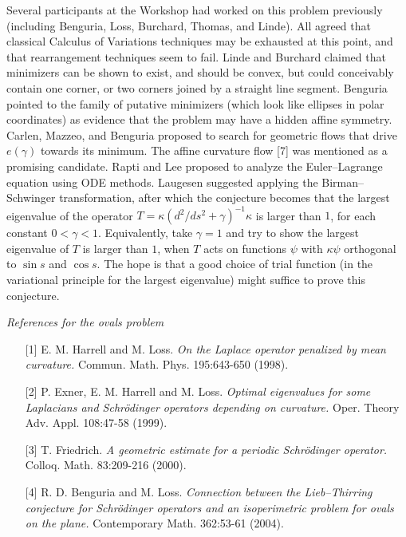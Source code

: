 \documentclass[12pt,letterpaper, reqno]{amsart}
\begin{document}
\begin{problemblock}
\begin{remark}
Several participants at the Workshop had worked on this problem
previously (including Benguria, Loss, Burchard, Thomas, and Linde).
All agreed that classical Calculus of Variations techniques may be
exhausted at this point, and that rearrangement techniques seem to
fail. Linde and Burchard claimed that minimizers can be shown to
exist, and should be convex, but could conceivably contain one
corner, or two corners joined by a straight line segment.  Benguria
pointed to the family of putative minimizers (which look like
ellipses in polar coordinates) as evidence that the problem may have
a hidden affine symmetry. Carlen, Mazzeo, and Benguria proposed to
search for geometric flows that drive $e(\gamma)$ towards its
minimum. The affine curvature flow [7] was mentioned as a promising
candidate. Rapti and Lee proposed to analyze the Euler--Lagrange
equation using ODE methods. Laugesen suggested applying the
Birman--Schwinger transformation, after which the conjecture becomes
that the largest eigenvalue of the operator $T = \kappa (d^2/ds^2 +
\gamma)^{-1} \kappa$ is larger than $1$, for each constant
$0<\gamma<1$. Equivalently, take $\gamma=1$ and try to show the
largest eigenvalue of $T$ is larger than $1$, when $T$ acts on
functions $\psi$ with $\kappa \psi$ orthogonal to $\sin s$ and $\cos
s$. The hope is that a good choice of trial function (in the
variational principle for the largest eigenvalue) might suffice to
prove this conjecture.
\end{remark}

\vspace{6pt} \noindent \emph{References for the ovals problem}

\begin{itemize}

\item[{[1]}] E. M. Harrell and M. Loss. \emph{On the Laplace operator
penalized by mean curvature.} Commun. Math. Phys. 195:643-650
(1998).

\item[{[2]}] P. Exner, E. M. Harrell and M. Loss. \emph{Optimal
eigenvalues  for some Laplacians and Schr\"odinger operators
depending on curvature.} Oper. Theory Adv. Appl. 108:47-58 (1999).

\item[{[3]}] T. Friedrich. \emph{A geometric estimate for
a periodic Schr\"odinger operator.} Colloq. Math. 83:209-216 (2000).

\item[{[4]}] R. D. Benguria and M. Loss. \emph{Connection between
the Lieb--Thirring conjecture for Schr\"o\-dinger operators and an
isoperimetric problem for ovals on the plane.} Contemporary Math.
362:53-61 (2004).


\end{itemize}
\end{problemblock}
\end{document}
